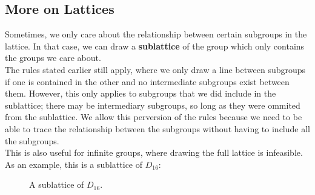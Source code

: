 \documentclass[12pt]{article}
\newcommand{\ang}[1]{\langle #1 \rangle}
\begin{document}
    \subsection*{More on Lattices}
    
    Sometimes, we only care about the relationship
    between certain subgroups in the lattice.
    In that case, we can draw a \textbf{sublattice}
    of the group which only contains the groups we care about. \\
    The rules stated earlier still apply,
    where we only draw a line between subgroups
    if one is contained in the other
    and no intermediate subgroups exist between them.
    However, this only applies to subgroups that we did include
    in the sublattice;
    there may be intermediary subgroups,
    so long as they were ommited from the sublattice.
    We allow this perversion of the rules
    because we need to be able to
    trace the relationship between the subgroups
    without having to include all the subgroups. \\
    This is also useful for infinite groups,
    where drawing the full lattice is infeasible.
    As an example, this is a sublattice of $D_16$:
    \begin{figure}[H]
        \centering
    \caption{\label{fig:figure1} A sublattice of $D_{16}$.}
    \end{figure} 
\end{document}
